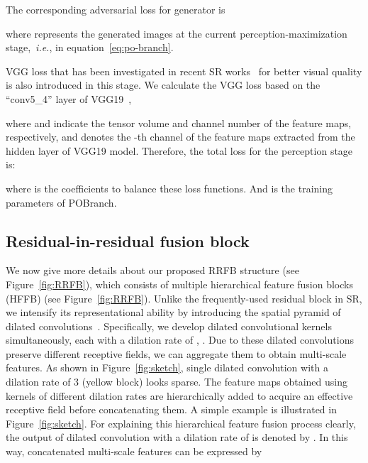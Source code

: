 \documentclass[preprint]{elsarticle}
\newcommand{\ie}{\textit{i.e.}}
\begin{document}
The corresponding adversarial loss for generator is

where  represents the generated images at the current perception-maximization stage,~\ie,  in equation~\ref{eq:po-branch}.

VGG loss that has been investigated in recent SR works~\cite{Perceptual-loss,SRGAN,EnhanceNet,ESRGAN} for better visual quality is also introduced in this stage. We calculate the VGG loss based on the ``conv5\_4'' layer of VGG19~\cite{VGG19},

where  and  indicate the tensor volume and channel number of the feature maps, respectively, and  denotes the -th channel of the feature maps extracted from the hidden layer of VGG19 model. Therefore, the total loss for the perception stage is:

where  is the coefficients to balance these loss functions. And  is the training parameters of POBranch.
\subsection{Residual-in-residual fusion block}
We now give more details about our proposed RRFB structure (see Figure~\ref{fig:RRFB}), which consists of multiple hierarchical feature fusion blocks (HFFB) (see Figure~\ref{fig:RRFB}). Unlike the frequently-used residual block in SR, we intensify its representational ability by introducing the spatial pyramid of dilated convolutions~\cite{ESPNet}. Specifically, we develop   dilated convolutional kernels simultaneously, each with a dilation rate of , . Due to these dilated convolutions preserve different receptive fields, we can aggregate them to obtain multi-scale features. As shown in Figure~\ref{fig:sketch}, single dilated convolution with a dilation rate of 3 (yellow block) looks sparse. The feature maps obtained using kernels of different dilation rates are hierarchically added to acquire an effective receptive field before concatenating them. A simple example is illustrated in Figure~\ref{fig:sketch}. For explaining this hierarchical feature fusion process clearly, the output of dilated convolution with a dilation rate of  is denoted by . In this way, concatenated multi-scale features  can be expressed by
\end{document}
